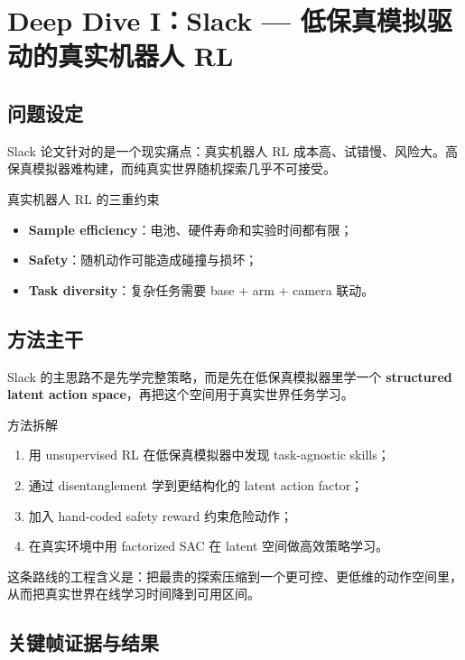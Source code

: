 \section{Deep Dive I：Slack --- 低保真模拟驱动的真实机器人 RL}

\subsection{问题设定}
Slack 论文针对的是一个现实痛点：真实机器人 RL 成本高、试错慢、风险大。高保真模拟器难构建，而纯真实世界随机探索几乎不可接受。

\begin{warningbox}{真实机器人 RL 的三重约束}
\begin{itemize}
    \item \textbf{Sample efficiency}：电池、硬件寿命和实验时间都有限；
    \item \textbf{Safety}：随机动作可能造成碰撞与损坏；
    \item \textbf{Task diversity}：复杂任务需要 base + arm + camera 联动。
\end{itemize}
\end{warningbox}

\subsection{方法主干}
Slack 的主思路不是先学完整策略，而是先在低保真模拟器里学一个 \textbf{structured latent action space}，再把这个空间用于真实世界任务学习。

\begin{knowledgebox}{方法拆解}
\begin{enumerate}
    \item 用 unsupervised RL 在低保真模拟器中发现 task-agnostic skills；
    \item 通过 disentanglement 学到更结构化的 latent action factor；
    \item 加入 hand-coded safety reward 约束危险动作；
    \item 在真实环境中用 factorized SAC 在 latent 空间做高效策略学习。
\end{enumerate}
\end{knowledgebox}

这条路线的工程含义是：把最贵的探索压缩到一个更可控、更低维的动作空间里，从而把真实世界在线学习时间降到可用区间。

\subsection{关键帧证据与结果}

